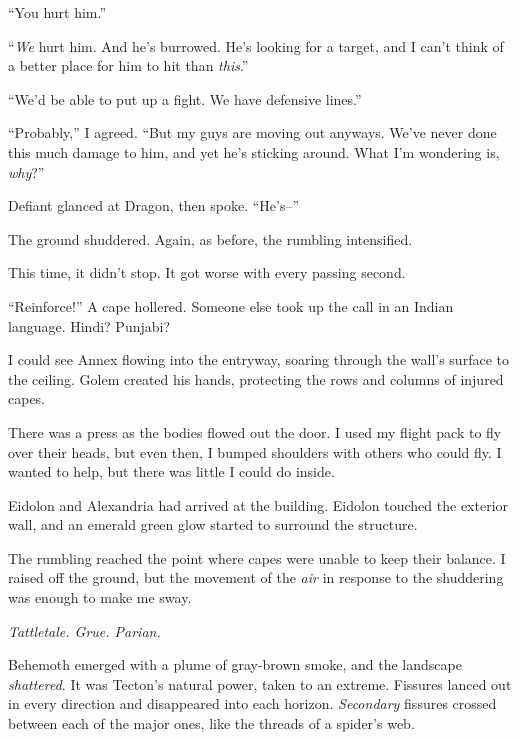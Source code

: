 ``You hurt him.''



``\emph{We} hurt him.  And he's burrowed.  He's looking for a target, and I can't think of a better place for him to hit than \emph{this}.''



``We'd be able to put up a fight.  We have defensive lines.''



``Probably,'' I agreed.  ``But my guys are moving out anyways.  We've never done this much damage to him, and yet he's sticking around.  What I'm wondering is, \emph{why}?''



Defiant glanced at Dragon, then spoke.  ``He's--''



The ground shuddered.  Again, as before, the rumbling intensified.



This time, it didn't stop.  It got worse with every passing second.



``Reinforce!''  A cape hollered.  Someone else took up the call in an Indian language.  Hindi?  Punjabi?



I could see Annex flowing into the entryway, soaring through the wall's surface to the ceiling.  Golem created his hands, protecting the rows and columns of injured capes.



There was a press as the bodies flowed out the door.  I used my flight pack to fly over their heads, but even then, I bumped shoulders with others who could fly.  I wanted to help, but there was little I could do inside.



Eidolon and Alexandria had arrived at the building.  Eidolon touched the exterior wall, and an emerald green glow started to surround the structure.



The rumbling reached the point where capes were unable to keep their balance.  I raised off the ground, but the movement of the \emph{air} in response to the shuddering was enough to make me sway.



\emph{Tattletale.  Grue.  Parian.}



Behemoth emerged with a plume of gray-brown smoke, and the landscape \emph{shattered}.  It was Tecton's natural power, taken to an extreme.  Fissures lanced out in every direction and disappeared into each horizon.  \emph{Secondary} fissures\emph{ }crossed between each of the major ones, like the threads of a spider's web.



